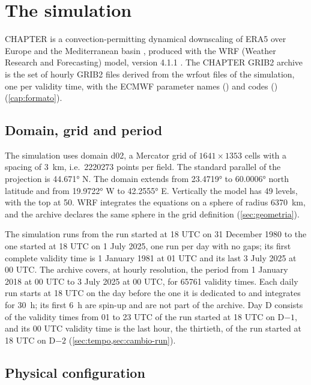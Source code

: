 \chapter{The simulation}
\label{cap:simulazione}

CHAPTER is a convection-permitting dynamical downscaling of ERA5 over Europe and the Mediterranean
basin \parencite{bernini2025}, produced with the WRF (Weather Research and Forecasting) model,
version 4.1.1 \parencite{wrf411}. The CHAPTER GRIB2 archive is the set of hourly GRIB2 files
derived from the wrfout files of the simulation, one per validity time, with the ECMWF parameter
names () and codes () (\cref{cap:formato}).

\section{Domain, grid and period}
\label{sec:dominio}

The simulation uses domain d02, a Mercator grid of $\num{1641} \times \num{1353}$ cells with a
spacing of \SI{3}{km}, i.e.\ \num{2220273} points per field. The standard parallel of the
projection is \ang{44.671} N. The domain extends from \ang{23.4719} to \ang{60.0006} north
latitude and from \ang{19.9722} W to \ang{42.2555} E. Vertically the model has 49 levels, with the
top at \SI{50}{\hPa}. WRF integrates the equations on a sphere of radius \SI{6370}{km}, and the
archive declares the same sphere in the grid definition (\cref{sec:geometria}).

The simulation runs from the run started at 18 UTC on 31 December 1980 to the one started at 18 UTC
on 1 July 2025, one run per day with no gaps; its first complete validity time is 1 January 1981 at
01 UTC and its last 3 July 2025 at 00 UTC. The archive covers, at hourly resolution, the period from
1 January 2018 at 00 UTC to 3 July 2025 at 00 UTC, for \num{65761} validity times. Each daily run starts at 18 UTC on the day before the one it is dedicated to
and integrates for \SI{30}{h}; its first \SI{6}{h} are spin-up and are not part of the archive. Day
D consists of the validity times from 01 to 23 UTC of the run started at 18 UTC on D$-1$, and its
00 UTC validity time is the last hour, the thirtieth, of the run started at 18 UTC on D$-2$
(\cref{sec:tempo,sec:cambio-run}).

\section{Physical configuration}
\label{sec:configurazione}

